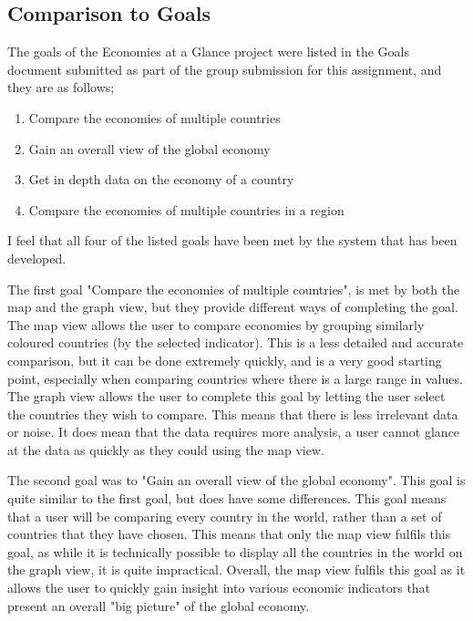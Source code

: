 \documentclass[10pt, journal]{IEEEtran}
\begin{document}
\subsection{Comparison to Goals}

The goals of the Economies at a Glance project were listed in the Goals document \cite{goals} submitted as part of the group submission for this assignment, and they are as follows;

\begin{enumerate}
\item{Compare the economies of multiple countries}
\item{Gain an overall view of the global economy}
\item{Get in depth data on the economy of a country}
\item{Compare the economies of multiple countries in a region}
\end{enumerate}

I feel that all four of the listed goals have been met by the system that has been developed.

The first goal "Compare the economies of multiple countries", is met by both the map and the graph view, but they provide different ways of completing the goal.  The map view allows the user to compare economies by grouping similarly coloured countries (by the selected indicator). This is a less detailed and accurate comparison, but it can be done extremely quickly, and is a very good starting point, especially when comparing countries where there is a large range in values. The graph view allows the user to complete this goal by letting the user select the countries they wish to compare. This means that there is less irrelevant data or noise. It does mean that the data requires more analysis, a user cannot glance at the data as quickly as they could using the map view. 

The second goal was to "Gain an overall view of the global economy". This goal is quite similar to the first goal, but does have some differences. This goal means that a user will be comparing every country in the world, rather than a set of countries that they have chosen. This means that only the map view fulfils this goal, as while it is technically possible to display all the countries in the world on the graph view, it is quite impractical. Overall, the map view fulfils this goal as it allows the user to quickly gain insight into various economic indicators that present an overall "big picture" of the global economy.
\end{document}
